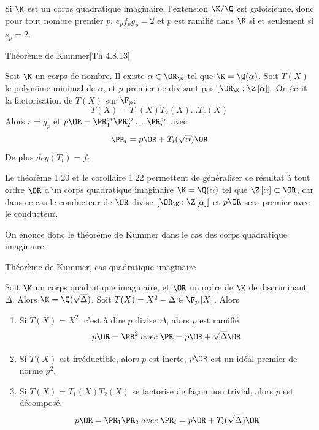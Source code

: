 \begin{Rem}
	Si $\K$ est un corps quadratique imaginaire, l'extension $\K/\Q$ est galoisienne, donc pour tout nombre premier $p$, $e_{p}f_{p}g_{p} = 2$ et $p$ est ramifié dans $\K$ si et seulement si $e_{p} = 2$.
\end{Rem}

\begin{The}{Théorème de Kummer}\cite{Coh00}[Th 4.8.13]
	
	
	Soit $\K$ un corps de nombre. Il existe $\alpha\in\OR_{\K}$ tel que $\K = \Q(\alpha)$. Soit $T(X)$ le polynôme minimal de $\alpha$, et $p$ premier ne divisant pas $\left[ \OR_{\K} : \Z\left[ \alpha\right] \right] $. On écrit la factorisation de $T(X)$ sur $\F_{p}$:
	\begin{equation*}
		T(X) = T_{1}(X)T_{2}(X)\ldots T_{r}(X)
	\end{equation*}
	Alors $r = g_{p}$ et $p\OR = \PR_{1}^{e_{1}}\PR_{2}^{e_{2}}\ldots\PR_{r}^{e_{r}}$ avec
	\begin{equation*}
		\PR_{i} = p\OR + T_{i}(\sqrt{\alpha})\OR 
	\end{equation*}
	De plus $deg(T_{i}) = f_{i}$
\end{The}

\begin{Rem}
	Le théorème 1.20 et le corollaire 1.22 permettent de généraliser ce résultat à tout ordre $\OR$ d'un corps quadratique imaginaire $\K = \Q(\alpha)$ tel que $\Z\left[ \alpha\right] \subset \OR$, car dans ce cas le conducteur de $\OR$ divise $\left[ \OR_{\K} : \Z\left[ \alpha\right] \right]$ et $p\OR$ sera premier avec le conducteur. 
\end{Rem}

On énonce donc le théorème de Kummer dans le cas des corps quadratique imaginaire. 

\begin{Prop}{Théorème de Kummer, cas quadratique imaginaire}
	
	Soit $\K$ un corps quadratique imaginaire, et $\OR$ un ordre de $\K$ de discriminant $\Delta$. Alors $\K = \Q(\sqrt{\Delta})$. Soit $T(X) = X^2 - \Delta \in\F_{p}\left[ X\right] $. Alors
	\begin{enumerate}
		\item Si $T(X) = X^2$, c'est à dire $p$ divise $\Delta$, alors $p$ est ramifié.
		\begin{equation*}
			p\OR = \PR^{2}\; avec \; \PR = p\OR + \sqrt{\Delta}\OR
		\end{equation*}
		
		\item Si $T(X)$ est irréductible, alors $p$ est inerte, $p\OR$ est un idéal premier de norme $p^{2}$.
		
		\item Si $T(X) = T_{1}(X)T_{2}(X)$ se factorise de façon non trivial, alors $p$ est décomposé.
		\begin{equation*}
			p\OR = \PR_{1}\PR_{2}\; avec \; \PR_{i} = p\OR + T_{i}(\sqrt{\Delta})\OR
		\end{equation*}
		
	\end{enumerate}
\end{Prop}

